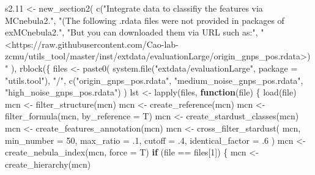 \documentclass[
]{article}
\newenvironment{Shaded}{\begin{snugshade}}{\end{snugshade}}
\newcommand{\AttributeTok}[1]{\textcolor[rgb]{0.77,0.63,0.00}{#1}}
\newcommand{\ControlFlowTok}[1]{\textcolor[rgb]{0.13,0.29,0.53}{\textbf{#1}}}
\newcommand{\DecValTok}[1]{\textcolor[rgb]{0.00,0.00,0.81}{#1}}
\newcommand{\FloatTok}[1]{\textcolor[rgb]{0.00,0.00,0.81}{#1}}
\newcommand{\FunctionTok}[1]{\textcolor[rgb]{0.00,0.00,0.00}{#1}}
\newcommand{\NormalTok}[1]{#1}
\newcommand{\OtherTok}[1]{\textcolor[rgb]{0.56,0.35,0.01}{#1}}
\newcommand{\SpecialCharTok}[1]{\textcolor[rgb]{0.00,0.00,0.00}{#1}}
\newcommand{\StringTok}[1]{\textcolor[rgb]{0.31,0.60,0.02}{#1}}
\begin{document}
\begin{Shaded}
\begin{Highlighting}[]
\NormalTok{s2}\FloatTok{.11} \OtherTok{\textless{}{-}} \FunctionTok{new\_section2}\NormalTok{(}
  \FunctionTok{c}\NormalTok{(}\StringTok{"Integrate data to classifiy the \textquotesingle{}features\textquotesingle{} via MCnebula2."}\NormalTok{,}
    \StringTok{"(The following .rdata files were not provided in packages of \textquotesingle{}exMCnebula2\textquotesingle{}."}\NormalTok{,}
    \StringTok{"But you can downloaded them via URL such as:"}\NormalTok{,}
    \StringTok{"\textless{}https://raw.githubusercontent.com/Cao{-}lab{-}zcmu/utils\_tool/master/inst/extdata/evaluationLarge/origin\_gnps\_pos.rdata\textgreater{})"}
\NormalTok{    ),}
  \FunctionTok{rblock}\NormalTok{(\{}
\NormalTok{    files }\OtherTok{\textless{}{-}} \FunctionTok{paste0}\NormalTok{(}
      \FunctionTok{system.file}\NormalTok{(}\StringTok{"extdata/evaluationLarge"}\NormalTok{, }\AttributeTok{package =} \StringTok{"utils.tool"}\NormalTok{), }\StringTok{"/"}\NormalTok{,}
      \FunctionTok{c}\NormalTok{(}\StringTok{"origin\_gnps\_pos.rdata"}\NormalTok{, }\StringTok{"medium\_noise\_gnps\_pos.rdata"}\NormalTok{, }\StringTok{"high\_noise\_gnps\_pos.rdata"}\NormalTok{)}
\NormalTok{    )}
\NormalTok{    lst }\OtherTok{\textless{}{-}} \FunctionTok{lapply}\NormalTok{(files,}
      \ControlFlowTok{function}\NormalTok{(file) \{}
        \FunctionTok{load}\NormalTok{(file)}
\NormalTok{        mcn }\OtherTok{\textless{}{-}} \FunctionTok{filter\_structure}\NormalTok{(mcn)}
\NormalTok{        mcn }\OtherTok{\textless{}{-}} \FunctionTok{create\_reference}\NormalTok{(mcn)}
\NormalTok{        mcn }\OtherTok{\textless{}{-}} \FunctionTok{filter\_formula}\NormalTok{(mcn, }\AttributeTok{by\_reference =}\NormalTok{ T)}
\NormalTok{        mcn }\OtherTok{\textless{}{-}} \FunctionTok{create\_stardust\_classes}\NormalTok{(mcn)}
\NormalTok{        mcn }\OtherTok{\textless{}{-}} \FunctionTok{create\_features\_annotation}\NormalTok{(mcn)}
\NormalTok{        mcn }\OtherTok{\textless{}{-}} \FunctionTok{cross\_filter\_stardust}\NormalTok{(}
\NormalTok{          mcn, }\AttributeTok{min\_number =} \DecValTok{50}\NormalTok{, }\AttributeTok{max\_ratio =}\NormalTok{ .}\DecValTok{1}\NormalTok{, }\AttributeTok{cutoff =}\NormalTok{ .}\DecValTok{4}\NormalTok{, }\AttributeTok{identical\_factor =}\NormalTok{ .}\DecValTok{6}
\NormalTok{        )}
\NormalTok{        mcn }\OtherTok{\textless{}{-}} \FunctionTok{create\_nebula\_index}\NormalTok{(mcn, }\AttributeTok{force =}\NormalTok{ T)}
        \ControlFlowTok{if}\NormalTok{ (file }\SpecialCharTok{==}\NormalTok{ files[}\DecValTok{1}\NormalTok{]) \{}
\NormalTok{          mcn }\OtherTok{\textless{}{-}} \FunctionTok{create\_hierarchy}\NormalTok{(mcn)}

\end{Highlighting}
\end{Shaded}
\end{document}
